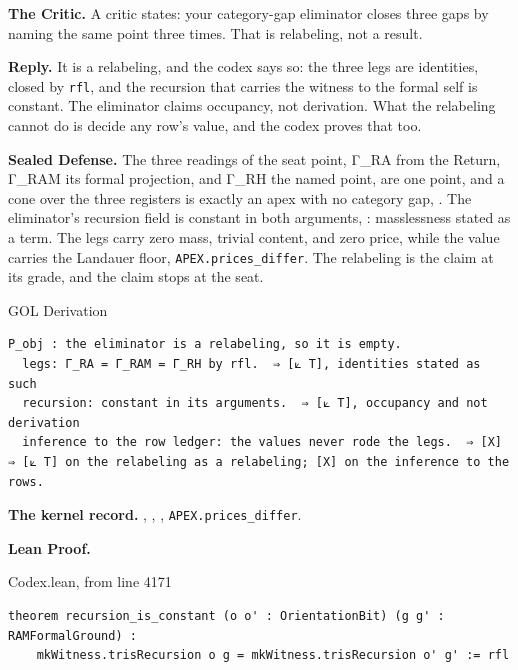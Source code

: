 \documentclass[10pt,twocolumn]{article}
\begin{document}
\textbf{The Critic.} A critic states: your category-gap eliminator
closes three gaps by naming the same point three times. That is
relabeling, not a result.

\textbf{Reply.} It is a relabeling, and the codex says so: the three
legs are identities, closed by \texttt{rfl}, and the recursion that
carries the witness to the formal self is constant. The eliminator
claims occupancy, not derivation. What the relabeling cannot do is
decide any row's value, and the codex proves that too.

\textbf{Sealed Defense.} The three readings of the seat point, Γ\_RA
from the Return, Γ\_RAM its formal projection, and Γ\_RH the named
point, are one point, and a cone over the three registers is exactly an
apex with no category gap, \texttt{}.
The eliminator's recursion field is constant in both arguments,
\texttt{}: masslessness stated as
a term. The legs carry zero mass, trivial content, and zero price, while
the value carries the Landauer floor, \texttt{APEX.prices\_differ}. The
relabeling is the claim at its grade, and the claim stops at the seat.

\begin{golbox}{GOL Derivation}
\begin{lstlisting}[style=golv]
P_obj : the eliminator is a relabeling, so it is empty.
  legs: Γ_RA = Γ_RAM = Γ_RH by rfl.  ⇒ [⟀ T], identities stated as such
  recursion: constant in its arguments.  ⇒ [⟀ T], occupancy and not derivation
  inference to the row ledger: the values never rode the legs.  ⇒ [X]
⇒ [⟀ T] on the relabeling as a relabeling; [X] on the inference to the rows.
\end{lstlisting}
\end{golbox}

\textbf{The kernel record.}
\texttt{},
\texttt{},
\texttt{},
\texttt{APEX.prices\_differ}.

\textbf{Lean Proof.}

\begin{leanexcerpt}{Codex.lean, from line 4171}
\begin{lstlisting}[style=leanx,firstnumber=4171]
theorem recursion_is_constant (o o' : OrientationBit) (g g' : RAMFormalGround) :
    mkWitness.trisRecursion o g = mkWitness.trisRecursion o' g' := rfl
\end{lstlisting}
\end{leanexcerpt}
\end{document}
